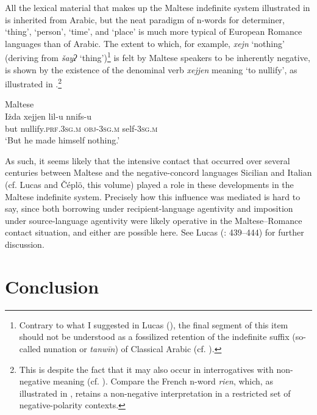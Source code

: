 \documentclass[output=paper]{langsci/langscibook}
\begin{document}
All the lexical material that makes up the Maltese indefinite system illustrated in  is inherited from Arabic, but the neat paradigm of n-words for determiner, ‘thing’, ‘person’, ‘time’, and ‘place’ is much more typical of European Romance languages than of Arabic. The extent to which, for example, \textit{xejn} ‘nothing’ (deriving from \textit{šayʔ} ‘thing’)\footnote{Contrary to what I suggested in Lucas (\citeyear[83--84]{Lucas2009}), the final segment of this item should not be understood as a fossilized retention of the indefinite suffix (so-called nunation or \textit{tanwīn}) of Classical Arabic (cf. \citealt{LucasSpagnol2019}).} is felt by Maltese speakers to be inherently negative, is shown by the existence of the denominal verb \textit{xejjen} meaning ‘to nullify’, as illustrated in .\footnote{This is despite the fact that it may also occur in interrogatives with non-negative meaning (cf. \citealt{CamilleriSadler2017}). Compare the French n-word \textit{rien}, which, as illustrated in , retains a non-negative interpretation in a restricted set of negative-polarity contexts.} 

\ea\label{ex:mlt1}
{       Maltese \citep[441]{Lucas2013}}\\
\gll Iżda xejjen lil-u nnifs-u\\
     but nullify.\textsc{prf.3sg.m} \textsc{obj-3sg.m} self-\textsc{3sg.m}\\
\glt ‘But he made himself nothing.’
\z

As such, it seems likely that the intensive contact that occurred over several centuries between Maltese and the negative-concord languages Sicilian and Italian (cf. Lucas and Čéplö, this volume) played a role in these developments in the Maltese indefinite system. Precisely how this influence was mediated is hard to say, since both borrowing under recipient-language agentivity and imposition under source-language agentivity were likely operative in the Maltese–Romance contact situation, and either are possible here. See Lucas (\citeyear{Lucas2013}: 439–444) for further discussion.

\section{Conclusion}
\end{document}
